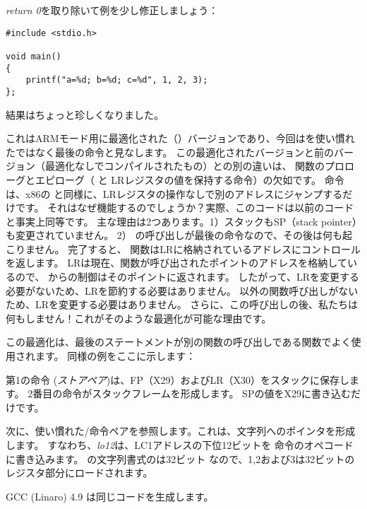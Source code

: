 \emph{return 0}を取り除いて例を少し修正しましょう：

\begin{lstlisting}[style=customc]
#include <stdio.h>

void main()
{
	printf("a=%d; b=%d; c=%d", 1, 2, 3);
};
\end{lstlisting}

結果はちょっと珍しくなりました。



これはARMモード用に最適化された（\Othree）バージョンであり、今回はを使い慣れたではなく最後の命令と見なします。
この最適化されたバージョンと前のバージョン（最適化なしでコンパイルされたもの）との別の違いは、
関数のプロローグとエピローグ（ と \ac{LR}レジスタの値を保持する命令）の欠如です。 
命令は、x86の \JMP と同様に、\ac{LR}レジスタの操作なしで別のアドレスにジャンプするだけです。
それはなぜ機能するのでしょうか？実際、このコードは以前のコードと事実上同等です。
主な理由は2つあります。1）スタックも\ac{SP}（\gls{stack pointer}）も変更されていません。 
2） \printf の呼び出しが最後の命令なので、その後は何も起こりません。
完了すると、 \printf 関数は\ac{LR}に格納されているアドレスにコントロールを返します。 
\ac{LR}は現在、関数が呼び出されたポイントのアドレスを格納しているので、 \printf からの制御はそのポイントに返されます。
したがって、\ac{LR}を変更する必要がないため、\ac{LR}を節約する必要はありません。 
\printf 以外の関数呼び出しがないため、\ac{LR}を変更する必要はありません。
さらに、この呼び出しの後、私たちは何もしません！これがそのような最適化が可能な理由です。

この最適化は、最後のステートメントが別の関数の呼び出しである関数でよく使用されます。
同様の例をここに示します：






第1の命令 (\emph{ストアペア})は、\ac{FP}（X29）および\ac{LR}（X30）をスタックに保存します。 
2番目の命令がスタックフレームを形成します。 
\ac{SP}の値をX29に書き込むだけです。

次に、使い慣れた/\ADD 命令ペアを参照します。これは、文字列へのポインタを形成します。 
すなわち、\emph{lo12}は、LC1アドレスの下位12ビットを \ADD 命令のオペコードに書き込みます。
\printf の文字列書式のは32ビット \Tint なので、1,2および3は32ビットのレジスタ部分にロードされます。

\Optimizing GCC (Linaro) 4.9 は同じコードを生成します。
